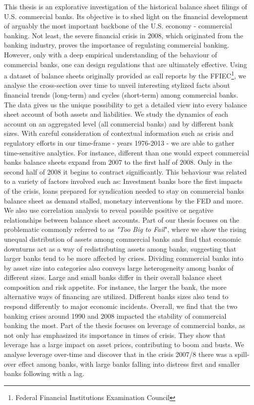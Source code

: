 \documentclass[12pt, a4paper]{article} %
\begin{document}
This thesis is an explorative investigation of the historical balance sheet filings of U.S. commercial banks. Its objective is to shed light on the financial development of arguably the most important backbone of the U.S. economy - commercial banking. Not least, the severe financial crisis in 2008, which originated from the banking industry, proves the importance of regulating commercial banking. However, only with a deep empirical understanding of the behaviour of commercial banks, one can design regulations that are ultimately effective. Using a dataset of balance sheets originally provided as call reports by the FFIEC\footnote{Federal Financial Institutions Examination Council}, we analyse the cross-section over time to unveil interesting stylized facts about financial trends (long-term) and cycles (short-term) among commercial banks. The data gives us the unique possibility to get a detailed view into every balance sheet account of both assets and liabilities. We study the dynamics of each account on an aggregated level (all commercial banks) and by different bank sizes. With careful consideration of contextual information such as crisis and regulatory efforts in our time-frame - years 1976-2013 - we are able to gather time-sensitive analytics. 
For instance, different than one would expect commercial banks balance sheets expand from $2007$ to the first half of $2008$. Only in the second half of $2008$ it begins to contract significantly. This behaviour was related to a variety of factors involved such as: Investment banks bore the first impacts of the crisis, loans prepared for syndication needed to stay on commercial banks balance sheet as demand stalled, monetary interventions by the FED and more.   
We also use correlation analysis to reveal possible positive or negative relationships between balance sheet accounts. Part of our thesis focuses on the problematic commonly referred to as \textit{"Too Big to Fail}", where we show the rising unequal distribution of assets among commercial banks and find that economic downturns act as a way of redistributing assets among banks, suggesting that larger banks tend to be more affected by crises. 
Dividing commercial banks into by asset size into categories also conveys large heterogeneity among banks of different sizes. 
Large and small banks differ in their overall balance sheet composition and risk appetite. For instance, the larger the bank, the more alternative ways of financing are utilized. Different banks sizes also tend to respond differently to major economic incidents. Overall, we find that
the two banking crises around 1990 and 2008 impacted the stability of commercial banking the most. Part of the thesis focuses on leverage of commercial banks, as not only \citet{geanakoplos2010leverage} has emphasized its importance in times of crisis. They show that leverage has a large impact on asset prices, contributing to boom and busts. We analyse leverage over-time and discover that in the crisis 2007/8 there was a spill-over effect among banks, with large banks falling into distress first and smaller banks following with a lag.
\end{document}
